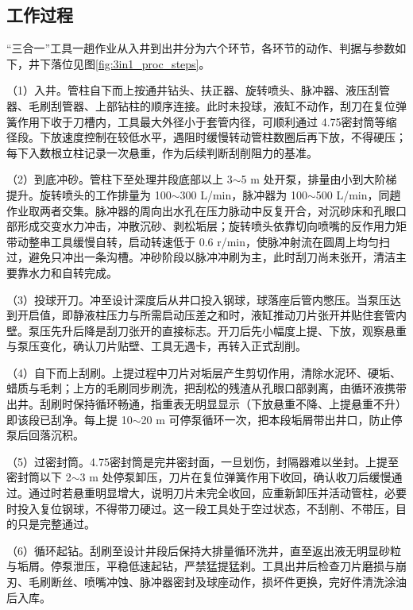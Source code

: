 \subsection{工作过程}

“三合一”工具一趟作业从入井到出井分为六个环节，各环节的动作、判据与参数如下，井下落位见图\ref{fig:3in1_proc_steps}。

（1）入井。管柱自下而上按通井钻头、扶正器、旋转喷头、脉冲器、液压刮管器、毛刷刮管器、上部钻柱的顺序连接。此时未投球，液缸不动作，刮刀在复位弹簧作用下收于刀槽内，工具最大外径小于套管内径，可顺利通过 4.75\inch 密封筒等缩径段。下放速度控制在较低水平，遇阻时缓慢转动管柱数圈后再下放，不得硬压；每下入数根立柱记录一次悬重，作为后续判断刮削阻力的基准。

（2）到底冲砂。管柱下至处理井段底部以上 3$\sim$5 m 处开泵，排量由小到大阶梯提升。旋转喷头的工作排量为 100$\sim$300 L/min，脉冲器为 100$\sim$500 L/min，同趟作业取两者交集。脉冲器的周向出水孔在压力脉动中反复开合，对沉砂床和孔眼口部形成交变水力冲击，冲散沉砂、剥松垢层；旋转喷头依靠切向喷嘴的反作用力矩带动整串工具缓慢自转，启动转速低于 0.6 r/min，使脉冲射流在圆周上均匀扫过，避免只冲出一条沟槽。冲砂阶段以脉冲冲刷为主，此时刮刀尚未张开，清洁主要靠水力和自转完成。

（3）投球开刀。冲至设计深度后从井口投入钢球，球落座后管内憋压。当泵压达到开启值，即静液柱压力与所需启动压差之和时，液缸推动刀片张开并贴住套管内壁。泵压先升后降是刮刀张开的直接标志。开刀后先小幅度上提、下放，观察悬重与泵压变化，确认刀片贴壁、工具无遇卡，再转入正式刮削。

（4）自下而上刮刷。上提过程中刀片对垢层产生剪切作用，清除水泥环、硬垢、蜡质与毛刺；上方的毛刷同步刷洗，把刮松的残渣从孔眼口部剥离，由循环液携带出井。刮刷时保持循环畅通，指重表无明显显示（下放悬重不降、上提悬重不升）即该段已刮净。每上提 10$\sim$20 m 可停泵循环一次，把本段垢屑带出井口，防止停泵后回落沉积。

（5）过密封筒。4.75\inch 密封筒是完井密封面，一旦划伤，封隔器难以坐封。上提至密封筒以下 2$\sim$3 m 处停泵卸压，刀片在复位弹簧作用下收回，确认收刀后缓慢通过。通过时若悬重明显增大，说明刀片未完全收回，应重新卸压并活动管柱，必要时投入复位钢球，不得带刀硬过。这一段工具处于空过状态，不刮削、不带压，目的只是完整通过。

（6）循环起钻。刮刷至设计井段后保持大排量循环洗井，直至返出液无明显砂粒与垢屑。停泵泄压，平稳低速起钻，严禁猛提猛刹。工具出井后检查刀片磨损与崩刃、毛刷断丝、喷嘴冲蚀、脉冲器密封及球座动作，损坏件更换，完好件清洗涂油后入库。

